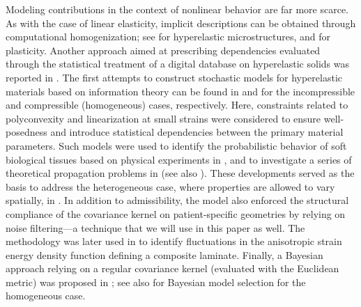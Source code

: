 Modeling contributions in the context of nonlinear behavior are far more scarce. As with the case of linear elasticity, implicit descriptions can be obtained through computational homogenization; see \cite{Clement2012,Clement2013} for hyperelastic microstructures, and \cite{OZTURK2021104294} for plasticity. Another approach aimed at prescribing dependencies evaluated through the statistical treatment of a digital database on hyperelastic solids was reported in \cite{caylak2018stochastic}. The first attempts to construct stochastic models for hyperelastic materials based on information theory can be found in \cite{staber2015stochastic} and \cite{Staber2017zamm} for the incompressible and compressible (homogeneous) cases, respectively. Here, constraints related to polyconvexity and linearization at small strains were considered to ensure well-posedness and introduce statistical dependencies between the primary material parameters. Such models were used to identify the probabilistic behavior of soft biological tissues based on physical experiments in \cite{STABER2017743}, and to investigate a series of theoretical propagation problems in \cite{Mihai-1, Mihai-2, Mihai-3, Mihai-4} (see also \cite{mihai2018stochastic}). These developments served as the basis to address the heterogeneous case, where properties are allowed to vary spatially, in \cite{STABER201894}. In addition to admissibility, the model also enforced the structural compliance of the covariance kernel on patient-specific geometries by relying on noise filtering---a technique that we will use in this paper as well. The methodology was later used in \cite{staber2019stochastic} to identify fluctuations in the anisotropic strain energy density function defining a composite laminate. Finally, a Bayesian approach relying on a regular covariance kernel (evaluated with the Euclidean metric) was proposed in \cite{Biehler2015}; see also \cite{fitt2019uncertainty} for Bayesian model selection for the homogeneous case. 
